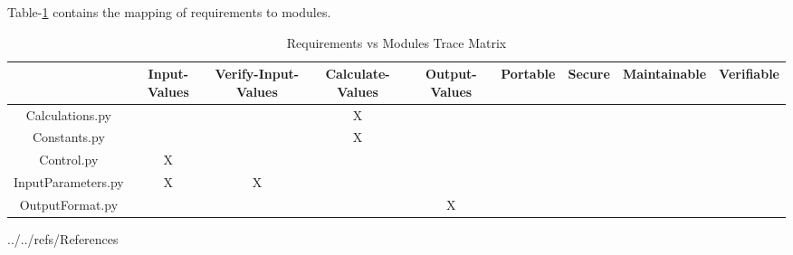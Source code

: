 \documentclass[12pt, titlepage]{article}
\begin{document}
Table-\ref{tblTrace2} contains the mapping of requirements to modules.
  
\begin{table}[]
\begin{adjustbox}{width=1.29\textwidth}
\begin{tabular}{c|c|c|c|c|c|c|c|c|}
 & Input-Values & Verify-Input-Values & Calculate-Values & Output-Values & Portable & Secure & Maintainable & Verifiable \\ \hline
Calculations.py	      &  &  & X  &   &  &  &  &  \\
Constants.py	      &  &  & X  &   &  &  &  &  \\
Control.py		      &X  &  &  &   &  &  &  &  \\
InputParameters.py  &X  &X  &  &   &  &  &  &  \\
OutputFormat.py &   &  &  &X   &  &  &  &  \\
\end{tabular}
\end{adjustbox}
\caption{Requirements vs Modules Trace Matrix}
\label{tblTrace2}
\end{table}



 {../../refs/References}







\end{document}

